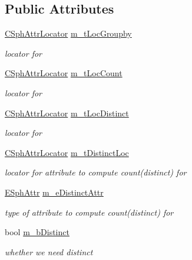\subsection*{Public Attributes}
\begin{DoxyCompactItemize}
\item 
\hyperlink{structCSphAttrLocator}{C\-Sph\-Attr\-Locator} \hyperlink{structCSphGroupSorterSettings_a0afffef6aac99d41a348961881960162}{m\-\_\-t\-Loc\-Groupby}
\begin{DoxyCompactList}\small\item\em locator for  \end{DoxyCompactList}\item 
\hyperlink{structCSphAttrLocator}{C\-Sph\-Attr\-Locator} \hyperlink{structCSphGroupSorterSettings_a3b7a40d09116a62563a26b90dad2715a}{m\-\_\-t\-Loc\-Count}
\begin{DoxyCompactList}\small\item\em locator for  \end{DoxyCompactList}\item 
\hyperlink{structCSphAttrLocator}{C\-Sph\-Attr\-Locator} \hyperlink{structCSphGroupSorterSettings_a34ecf99b7f404aab7476e459dea8df6d}{m\-\_\-t\-Loc\-Distinct}
\begin{DoxyCompactList}\small\item\em locator for  \end{DoxyCompactList}\item 
\hyperlink{structCSphAttrLocator}{C\-Sph\-Attr\-Locator} \hyperlink{structCSphGroupSorterSettings_a84e448e7c765cdc8f4674a577f3ff6b1}{m\-\_\-t\-Distinct\-Loc}
\begin{DoxyCompactList}\small\item\em locator for attribute to compute count(distinct) for \end{DoxyCompactList}\item 
\hyperlink{sphinxexpr_8h_aa883df0db2e4468a107fdd2d2ae625a3}{E\-Sph\-Attr} \hyperlink{structCSphGroupSorterSettings_a5cf4da17e82a9183dece0b40442bf6a8}{m\-\_\-e\-Distinct\-Attr}
\begin{DoxyCompactList}\small\item\em type of attribute to compute count(distinct) for \end{DoxyCompactList}\item 
bool \hyperlink{structCSphGroupSorterSettings_a493fe7f4268046480bec6c40926796a4}{m\-\_\-b\-Distinct}
\begin{DoxyCompactList}\small\item\em whether we need distinct \end{DoxyCompactList}\item 

\end{DoxyCompactItemize}
